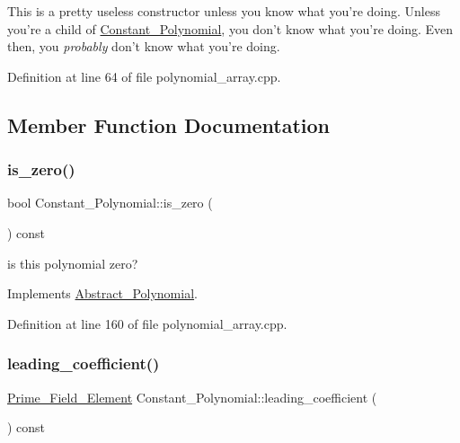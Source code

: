 This is a pretty useless constructor unless you know what you're doing. Unless you're a child of \hyperlink{class_constant___polynomial}{Constant\+\_\+\+Polynomial}, you don't know what you're doing. Even then, you {\itshape probably} don't know what you're doing. 

Definition at line 64 of file polynomial\+\_\+array.\+cpp.



\subsection{Member Function Documentation}
\mbox{\label{class_constant___polynomial_adbd5016d94426e8ec821449466dd55e7}} 
\subsubsection{\texorpdfstring{is\+\_\+zero()}{is\_zero()}}
{\footnotesize\ttfamily bool Constant\+\_\+\+Polynomial\+::is\+\_\+zero (\begin{DoxyParamCaption}{ }\end{DoxyParamCaption}) const\hspace{0.3cm}{\ttfamily [virtual]}}

is this polynomial zero? 

Implements \hyperlink{class_abstract___polynomial_afb4895702dd56895a792850a831c2f51}{Abstract\+\_\+\+Polynomial}.



Definition at line 160 of file polynomial\+\_\+array.\+cpp.

\mbox{\label{class_constant___polynomial_a156c805fdc50c904fcf66807a8e813cc}} 
\subsubsection{\texorpdfstring{leading\+\_\+coefficient()}{leading\_coefficient()}}
{\footnotesize\ttfamily \hyperlink{class_prime___field___element}{Prime\+\_\+\+Field\+\_\+\+Element} Constant\+\_\+\+Polynomial\+::leading\+\_\+coefficient (\begin{DoxyParamCaption}{ }\end{DoxyParamCaption}) const\hspace{0.3cm}{\ttfamily [virtual]}}

